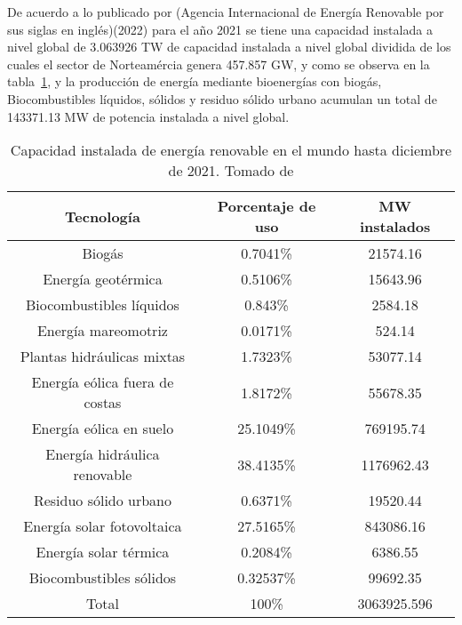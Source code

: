 De acuerdo a lo publicado por \textcite{irenahighlight2022} (Agencia Internacional de Energía Renovable por sus siglas en inglés)(2022) para el año 2021 se tiene una capacidad instalada a nivel global de 3.063926 TW de capacidad instalada a nivel global dividida de los cuales el sector de Norteamércia genera 457.857 GW, y como se observa en la tabla~\ref{tab:capren1}, y la producción de energía mediante bioenergías con biogás, Biocombustibles líquidos, sólidos y residuo sólido urbano acumulan un total de 143371.13 MW de potencia instalada a nivel global.

 \begin{table}[H]
 \centering
 \caption{Capacidad instalada de energía renovable en el mundo hasta diciembre de 2021. \linebreak Tomado de \textcite{irenahighlight2022}}
 \label{tab:capren1}
 \begin{tabular}{ccc}
     \hline
     Tecnología                         & Porcentaje de uso & MW instalados \\
     \hline
         Biogás                         & 0.7041\%          & 21574.16      \\
         Energía geotérmica             & 0.5106\%          & 15643.96      \\
         Biocombustibles líquidos       & 0.843\%           & 2584.18       \\
         Energía mareomotriz            & 0.0171\%          & 524.14        \\
         Plantas hidráulicas mixtas     & 1.7323\%          & 53077.14      \\
         Energía eólica fuera de costas & 1.8172\%          & 55678.35      \\
         Energía eólica en suelo        & 25.1049\%         & 769195.74     \\
         Energía hidráulica renovable   & 38.4135\%         & 1176962.43    \\
         Residuo sólido urbano          & 0.6371\%          & 19520.44      \\
         Energía solar fotovoltaica     & 27.5165\%         & 843086.16     \\
         Energía solar térmica          & 0.2084\%          & 6386.55       \\
         Biocombustibles sólidos        & 0.32537\%         & 99692.35      \\
         \hline
         Total                          & 100\%             & 3063925.596   \\
         \hline

     \end{tabular}
 \end{table}


